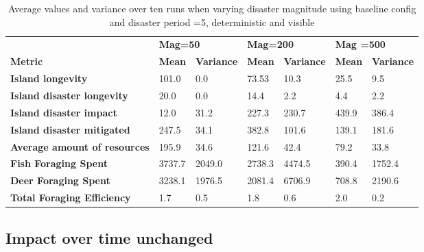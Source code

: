 \begin{center}
\begin{table}[h]
\begin{tabular}{l|ll|ll|ll}
                                     & \multicolumn{2}{l}{\textbf{Mag=50}} & \multicolumn{2}{l}{\textbf{Mag=200}} & \multicolumn{2}{l}{\textbf{Mag =500}} \\
\textbf{Metric}                      & \textbf{Mean}  & \textbf{Variance}  & \textbf{Mean}   & \textbf{Variance}   & \textbf{Mean}   & \textbf{Variance}   \\ \hline
\textbf{Island longevity}            & 101.0          & 0.0                & 73.53           & 10.3               & 25.5            & 9.5                 \\
\textbf{Island disaster longevity}   & 20.0           & 0.0                & 14.4            & 2.2                & 4.4             & 2.2                 \\
\textbf{Island disaster impact}      & 12.0           & 31.2               & 227.3           & 230.7              & 439.9           & 386.4               \\
\textbf{Island disaster mitigated}   & 247.5          & 34.1               & 382.8           & 101.6              & 139.1           & 181.6               \\
\textbf{Average amount of resources} & 195.9          & 34.6               & 121.6           & 42.4               & 79.2            & 33.8                \\
\textbf{Fish Foraging Spent}         & 3737.7         & 2049.0             & 2738.3          & 4474.5             & 390.4           & 1752.4              \\
\textbf{Deer Foraging Spent}         & 3238.1         & 1976.5             & 2081.4          & 6706.9             & 708.8           & 2190.6              \\
\textbf{Total Foraging Efficiency}    & 1.7            & 0.5                & 1.8             & 0.6                & 2.0             & 0.2                
\end{tabular}
\caption{Average values and variance over ten runs when varying disaster magnitude using baseline config and disaster period =5, deterministic and visible}
\label{tab:16_results_and_eval:Disasters:magnitude}
\end{table}
\end{center}
\subsection{Impact over time unchanged}


